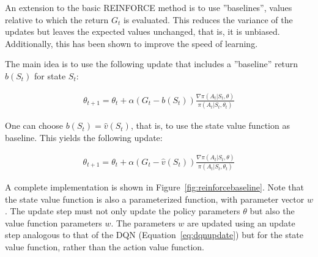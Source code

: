 An extension to the basic REINFORCE method is to use ''baselines'', values relative to which the return $G_t$ is evaluated. This reduces the variance of the updates but leaves the expected values unchanged, that is, it is unbiased. Additionally, this has been shown to improve the speed of learning. 

The main idea is to use the following update that includes a ''baseline'' return $b(S_t)$ for state $S_t$:

\begin{align*}
\theta_{t+1} = \theta_t + \alpha(G_t - b(S_t)) \frac{\nabla \pi(A_t | S_t, \theta)}{\pi(A_t | S_t, \theta_t)}
\end{align*}

One can choose $b(S_t) = \hat{v}(S_t)$, that is, to use the state value function as baseline. This yields the following update:

\begin{align*}
\theta_{t+1} = \theta_t + \alpha(G_t - \hat{v}(S_t)) \frac{\nabla \pi(A_t | S_t, \theta)}{\pi(A_t | S_t, \theta_t)}
\end{align*}

A complete implementation is shown in Figure~\ref{fig:reinforcebaseline}. Note that the state value function is also a parameterized function, with parameter vector $w$. The update step must not only update the policy parameters $\theta$ but also the value function parameters $w$. The parameters $w$ are updated using an update step analogous to that of the DQN (Equation~\ref{eq:dqnupdate}) but for the state value function, rather than the action value function.

